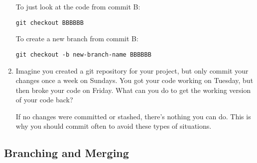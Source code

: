 \documentclass[10pt,twocolumn]{article}
\begin{document}
\begin{enumerate}
To just look at the code from commit B:

\texttt{git checkout BBBBBB}

To create a new branch from commit B:

\texttt{git checkout -b new-branch-name BBBBBB}
\item Imagine you created a git repository for your project, but only commit your changes once a week on Sundays. You got your code working on Tuesday, but then broke your code on Friday. What can you do to get the working version of your code back?

If no changes were committed or stashed, there's nothing you can do. This is why you should commit often to avoid these types of situations.
\end{enumerate}

\subsection{Branching and Merging}
\end{document}
